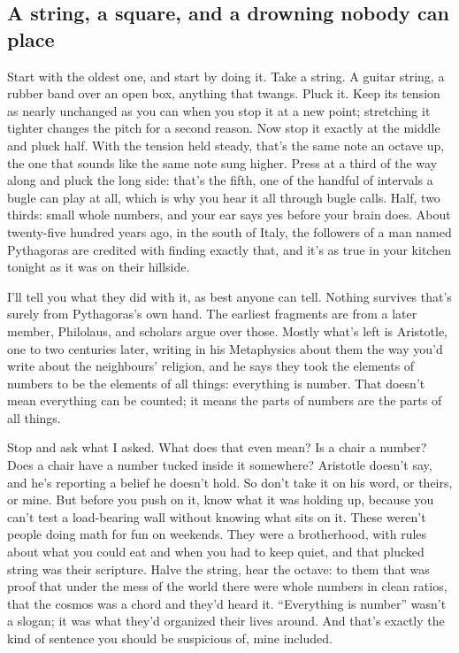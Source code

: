 \documentclass[11pt,twoside]{article}
\theoremstyle{thielethm}
\theoremstyle{thieledef}
\theoremstyle{thieledef}
\theoremstyle{thieledef}
\theoremstyle{thielethm}
\theoremstyle{thieleobs}
\theoremstyle{thielethm}
\begin{document}
\subsection{A string, a square, and a drowning nobody can place}

Start with the oldest one, and start by doing it. Take a string. A guitar string, a rubber band over an open box, anything that twangs. Pluck it. Keep its tension as nearly unchanged as you can when you stop it at a new point; stretching it tighter changes the pitch for a second reason. Now stop it exactly at the middle and pluck half. With the tension held steady, that's the same note an octave up, the one that sounds like the same note sung higher. Press at a third of the way along and pluck the long side: that's the fifth, one of the handful of intervals a bugle can play at all, which is why you hear it all through bugle calls. Half, two thirds: small whole numbers, and your ear says yes before your brain does. About twenty-five hundred years ago, in the south of Italy, the followers of a man named Pythagoras are credited with finding exactly that, and it's as true in your kitchen tonight as it was on their hillside.

I'll tell you what they did with it, as best anyone can tell. Nothing survives that's surely from Pythagoras's own hand. The earliest fragments are from a later member, Philolaus, and scholars argue over those. Mostly what's left is Aristotle, one to two centuries later, writing in his Metaphysics about them the way you'd write about the neighbours' religion, and he says they took the elements of numbers to be the elements of all things: everything is number. That doesn't mean everything can be counted; it means the parts of numbers are the parts of all things.

Stop and ask what I asked. What does that even mean? Is a chair a number? Does a chair have a number tucked inside it somewhere? Aristotle doesn't say, and he's reporting a belief he doesn't hold. So don't take it on his word, or theirs, or mine. But before you push on it, know what it was holding up, because you can't test a load-bearing wall without knowing what sits on it. These weren't people doing math for fun on weekends. They were a brotherhood, with rules about what you could eat and when you had to keep quiet, and that plucked string was their scripture. Halve the string, hear the octave: to them that was proof that under the mess of the world there were whole numbers in clean ratios, that the cosmos was a chord and they'd heard it. ``Everything is number'' wasn't a slogan; it was what they'd organized their lives around. And that's exactly the kind of sentence you should be suspicious of, mine included.
\end{document}
